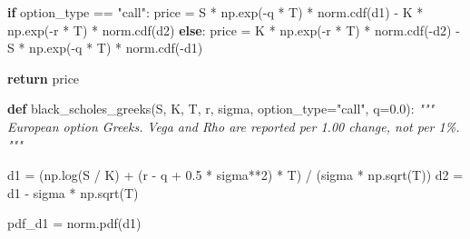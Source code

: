 \documentclass[
  11pt,
]{article}
\newenvironment{Shaded}{}{}
\newcommand{\CommentTok}[1]{\textcolor[rgb]{0.38,0.63,0.69}{\textit{#1}}}
\newcommand{\ControlFlowTok}[1]{\textcolor[rgb]{0.00,0.44,0.13}{\textbf{#1}}}
\newcommand{\DecValTok}[1]{\textcolor[rgb]{0.25,0.63,0.44}{#1}}
\newcommand{\FloatTok}[1]{\textcolor[rgb]{0.25,0.63,0.44}{#1}}
\newcommand{\KeywordTok}[1]{\textcolor[rgb]{0.00,0.44,0.13}{\textbf{#1}}}
\newcommand{\NormalTok}[1]{#1}
\newcommand{\OperatorTok}[1]{\textcolor[rgb]{0.40,0.40,0.40}{#1}}
\newcommand{\StringTok}[1]{\textcolor[rgb]{0.25,0.44,0.63}{#1}}
\begin{document}
\begin{Shaded}
\begin{Highlighting}[]
    \ControlFlowTok{if}\NormalTok{ option\_type }\OperatorTok{==} \StringTok{"call"}\NormalTok{:}
\NormalTok{        price }\OperatorTok{=}\NormalTok{ S }\OperatorTok{*}\NormalTok{ np.exp(}\OperatorTok{{-}}\NormalTok{q }\OperatorTok{*}\NormalTok{ T) }\OperatorTok{*}\NormalTok{ norm.cdf(d1) }\OperatorTok{{-}}\NormalTok{ K }\OperatorTok{*}\NormalTok{ np.exp(}\OperatorTok{{-}}\NormalTok{r }\OperatorTok{*}\NormalTok{ T) }\OperatorTok{*}\NormalTok{ norm.cdf(d2)}
    \ControlFlowTok{else}\NormalTok{:}
\NormalTok{        price }\OperatorTok{=}\NormalTok{ K }\OperatorTok{*}\NormalTok{ np.exp(}\OperatorTok{{-}}\NormalTok{r }\OperatorTok{*}\NormalTok{ T) }\OperatorTok{*}\NormalTok{ norm.cdf(}\OperatorTok{{-}}\NormalTok{d2) }\OperatorTok{{-}}\NormalTok{ S }\OperatorTok{*}\NormalTok{ np.exp(}\OperatorTok{{-}}\NormalTok{q }\OperatorTok{*}\NormalTok{ T) }\OperatorTok{*}\NormalTok{ norm.cdf(}\OperatorTok{{-}}\NormalTok{d1)}

    \ControlFlowTok{return}\NormalTok{ price}


\KeywordTok{def}\NormalTok{ black\_scholes\_greeks(S, K, T, r, sigma, option\_type}\OperatorTok{=}\StringTok{"call"}\NormalTok{, q}\OperatorTok{=}\FloatTok{0.0}\NormalTok{):}
    \CommentTok{"""}
\CommentTok{    European option Greeks.}
\CommentTok{    Vega and Rho are reported per 1.00 change, not per 1\%.}
\CommentTok{    """}

\NormalTok{    d1 }\OperatorTok{=}\NormalTok{ (np.log(S }\OperatorTok{/}\NormalTok{ K) }\OperatorTok{+}\NormalTok{ (r }\OperatorTok{{-}}\NormalTok{ q }\OperatorTok{+} \FloatTok{0.5} \OperatorTok{*}\NormalTok{ sigma}\OperatorTok{**}\DecValTok{2}\NormalTok{) }\OperatorTok{*}\NormalTok{ T) }\OperatorTok{/}\NormalTok{ (sigma }\OperatorTok{*}\NormalTok{ np.sqrt(T))}
\NormalTok{    d2 }\OperatorTok{=}\NormalTok{ d1 }\OperatorTok{{-}}\NormalTok{ sigma }\OperatorTok{*}\NormalTok{ np.sqrt(T)}

\NormalTok{    pdf\_d1 }\OperatorTok{=}\NormalTok{ norm.pdf(d1)}


\end{Highlighting}
\end{Shaded}
\end{document}
